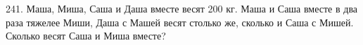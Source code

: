 241. Маша, Миша, Саша и Даша вместе  весят 200 кг. Маша и Саша вместе в два раза тяжелее Миши, Даша с Машей весят столько же, сколько и Саша с  Мишей. Сколько весят Саша и Миша вместе?\\
